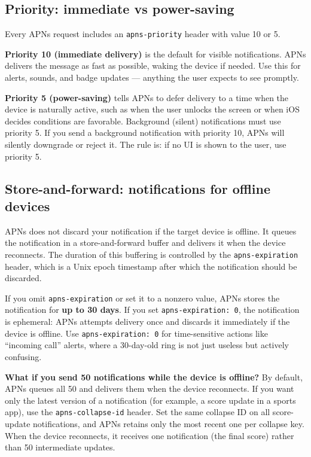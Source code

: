 \documentclass[11pt,a4paper]{article}
\begin{document}
\subsection{Priority: immediate vs power-saving}

Every APNs request includes an \texttt{apns-priority} header with value 10 or 5.

\textbf{Priority 10 (immediate delivery)} is the default for visible notifications. APNs delivers the message as fast as possible, waking the device if needed. Use this for alerts, sounds, and badge updates --- anything the user expects to see promptly.

\textbf{Priority 5 (power-saving)} tells APNs to defer delivery to a time when the device is naturally active, such as when the user unlocks the screen or when iOS decides conditions are favorable. Background (silent) notifications must use priority 5. If you send a background notification with priority 10, APNs will silently downgrade or reject it. The rule is: if no UI is shown to the user, use priority 5.

\subsection{Store-and-forward: notifications for offline devices}

APNs does not discard your notification if the target device is offline. It queues the notification in a store-and-forward buffer and delivers it when the device reconnects. The duration of this buffering is controlled by the \texttt{apns-expiration} header, which is a Unix epoch timestamp after which the notification should be discarded.

If you omit \texttt{apns-expiration} or set it to a nonzero value, APNs stores the notification for \textbf{up to 30 days}. If you set \texttt{apns-expiration: 0}, the notification is ephemeral: APNs attempts delivery once and discards it immediately if the device is offline. Use \texttt{apns-expiration: 0} for time-sensitive actions like ``incoming call'' alerts, where a 30-day-old ring is not just useless but actively confusing.

\begin{thinkbox}
\textbf{What if you send 50 notifications while the device is offline?} By default, APNs queues all 50 and delivers them when the device reconnects. If you want only the latest version of a notification (for example, a score update in a sports app), use the \texttt{apns-collapse-id} header. Set the same collapse ID on all score-update notifications, and APNs retains only the most recent one per collapse key. When the device reconnects, it receives one notification (the final score) rather than 50 intermediate updates.
\end{thinkbox}
\end{document}
